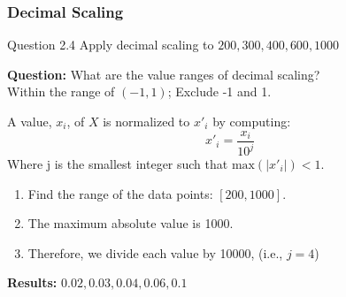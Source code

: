 \documentclass[aspectratio=169, 10pt]{beamer}
\begin{document}

\begin{frame}[t]
    \frametitle{Decimal Scaling}
    \small

    \begin{block}{Question 2.4}
        Apply decimal scaling to $200, 300, 400, 600, 1000$
    \end{block}

    \textbf{Question:} What are the value ranges of decimal scaling?\\
    Within the range of $(-1, 1)$; Exclude -1 and 1.
    \vspace{1em}

    A value, $x_i$, of $X$ is normalized to $x'_i$ by computing:
    \[
        x'_i = \frac{x_i}{10^j}
    \]
    Where j is the smallest integer such that $\text{max}(|x'_i|)<1$.
    \vspace{1em}

    \begin{enumerate}
        \item Find the range of the data points: $[200, 1000]$.
        \item The maximum absolute value is 1000.
        \item Therefore, we divide each value by 10000, (i.e., $j = 4$)
    \end{enumerate}
    
    \textbf{Results:} $0.02, 0.03, 0.04, 0.06, 0.1$
    
\end{frame}
\end{document}
